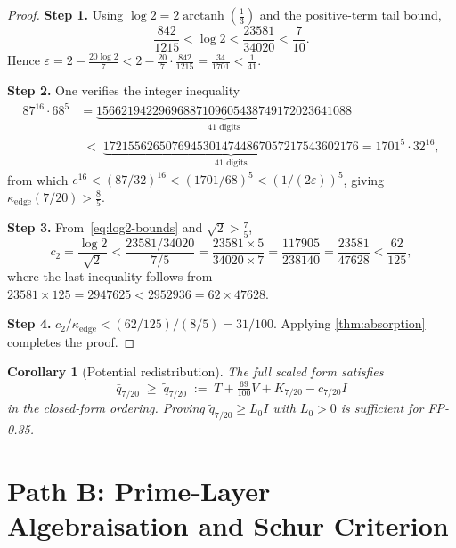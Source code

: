 \documentclass[12pt,a4paper]{amsart}
\theoremstyle{plain}
\newtheorem{corollary}[theorem]{Corollary}
\theoremstyle{definition}
\newcommand{\qbar}{\bar{q}}
\newcommand{\qtilde}{\tilde{q}}
\newcommand{\ctwo}{c_2}              %
\newcommand{\kappae}{\kappa_{\mathrm{edge}}}
\newcommand{\Lzero}{L_0}             %
\begin{document}
\begin{proof}
\textbf{Step 1.} Using $\log 2 = 2\operatorname{arctanh}(\tfrac{1}{3})$
and the positive-term tail bound,
\begin{equation}\label{eq:log2-bounds}
  \frac{842}{1215} < \log 2 < \frac{23581}{34020} < \frac{7}{10}.
\end{equation}
Hence $\varepsilon = 2 - \tfrac{20\log 2}{7} < 2 - \tfrac{20}{7}\cdot\tfrac{842}{1215}
= \tfrac{34}{1701} < \tfrac{1}{41}$.

\textbf{Step 2.}
One verifies the integer inequality
\begin{align*}
  87^{16} \cdot 68^5
  &= \underbrace{15662194229696887109605438749172023641088}_{41\text{ digits}} \\
  &\;<\;
  \underbrace{17215562650769453014744867057217543602176}_{41\text{ digits}}
  = 1701^5 \cdot 32^{16},
\end{align*}
from which $e^{16} < (87/32)^{16} < (1701/68)^5 < (1/(2\varepsilon))^5$,
giving $\kappae(7/20) > \tfrac{8}{5}$.

\textbf{Step 3.}
From~\eqref{eq:log2-bounds} and $\sqrt{2} > \tfrac{7}{5}$,
\[
  \ctwo = \frac{\log 2}{\sqrt{2}}
  < \frac{23581/34020}{7/5}
  = \frac{23581 \times 5}{34020 \times 7}
  = \frac{117905}{238140}
  = \frac{23581}{47628}
  < \frac{62}{125},
\]
where the last inequality follows from $23581 \times 125 = 2947625 < 2952936 = 62 \times 47628$.

\textbf{Step 4.}
$\ctwo/\kappae < (62/125)/(8/5) = 31/100$.
Applying \cref{thm:absorption} completes the proof.
\end{proof}

\begin{corollary}[Potential redistribution]
\label{cor:redistribution}
The full scaled form satisfies
\[
  \qbar_{7/20}
  \;\ge\;
  \qtilde_{7/20}
  \;:=\;
  T + \tfrac{69}{100}V + K_{7/20} - c_{7/20}I
\]
in the closed-form ordering.
Proving $\qtilde_{7/20} \ge \Lzero I$ with $\Lzero > 0$ is sufficient for
FP-0.35.
\end{corollary}

\section{Path B: Prime-Layer Algebraisation and Schur Criterion}
\label{sec:path-b}
\end{document}
